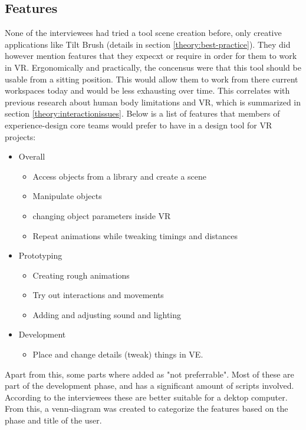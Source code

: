 \subsection{Features}
None of the interviewees had tried a tool scene creation before, only creative applications like Tilt Brush (details in section \ref{theory:best-practice}). They did however mention features that they expecxt or require in order for them to work in VR. Ergonomically and practically, the concensus were that this tool should be usable from a sitting position. This would allow them to work from there current workspaces today and would be less exhausting over time. This correlates with previous research about human body limitations and VR, which is summarized in section \ref{theory:interactionissues}. Below is a list of features that members of experience-design core teams would prefer to have in a design tool for VR projects:
\begin{itemize}
  \item Overall
  \begin{itemize}
    \item Access objects from a library and create a scene
    \item Manipulate objects
    \item changing object parameters inside VR
    \item Repeat animations while tweaking timings and distances
  \end{itemize}
  \item Prototyping
  \begin{itemize}
    \item Creating rough animations
    \item Try out interactions and movements
    \item Adding and adjusting sound and lighting
  \end{itemize}
  \item Development
  \begin{itemize}
    \item Place and change details (tweak) things in VE.
  \end{itemize}
\end{itemize}
Apart from this, some parts where added as "not preferrable". Most of these are part of the development phase, and has a significant amount of scripts involved. According to the interviewees these are better suitable for a dektop computer. From this, a venn-diagram was created to categorize the features based on the phase and title of the user.
